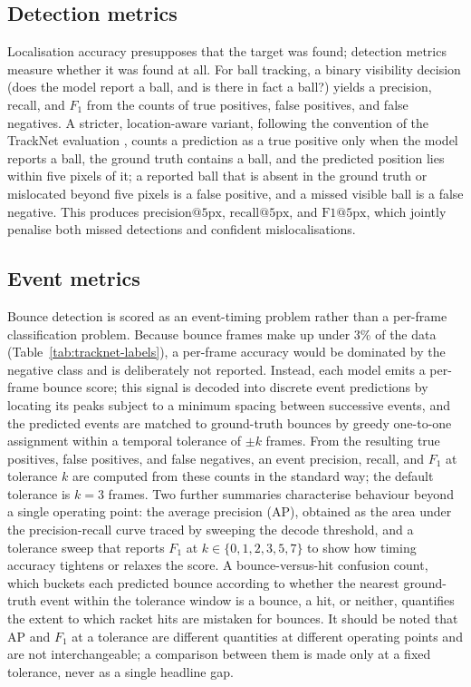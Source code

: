 \subsection{Detection metrics}
\label{sec:meth-metrics-det}

Localisation accuracy presupposes that the target was found; detection metrics
measure whether it was found at all. For ball tracking, a binary
visibility decision (does the model report a ball, and is there in fact a ball?)
yields a precision, recall, and $F_1$ from the counts of true positives,
false positives, and false negatives. A stricter, location-aware variant,
following the convention of the TrackNet evaluation \cite{huang2019tracknet},
counts a prediction as a true positive only when the model reports a ball, the
ground truth contains a ball, and the predicted position lies within five pixels
of it; a reported ball that is absent in the ground truth or mislocated beyond
five pixels is a false positive, and a missed visible ball is a false negative.
This produces $\mathrm{precision@5px}$, $\mathrm{recall@5px}$, and
$\mathrm{F1@5px}$, which jointly penalise both missed detections and confident
mislocalisations.
\subsection{Event metrics}
\label{sec:meth-metrics-event}

Bounce detection is scored as an event-timing problem rather than a per-frame
classification problem. Because bounce frames make up under 3\% of the data
(Table~\ref{tab:tracknet-labels}), a per-frame accuracy would be dominated by
the negative class and is deliberately not reported. Instead, each model emits a
per-frame bounce score; this signal is decoded into discrete event
predictions by locating its peaks subject to a minimum spacing between
successive events, and the predicted events are matched to ground-truth
bounces by greedy one-to-one assignment within a temporal tolerance of
$\pm k$ frames. From the resulting true positives, false positives, and false
negatives, an event precision, recall, and $F_1$ at tolerance $k$ are computed
from these counts in the standard way; the default tolerance is $k = 3$ frames. Two further
summaries characterise behaviour beyond a single operating point: the average
precision (AP), obtained as the area under the precision-recall curve traced by
sweeping the decode threshold, and a tolerance sweep that reports $F_1$ at
$k \in \{0, 1, 2, 3, 5, 7\}$ to show how timing accuracy tightens or relaxes the
score. A bounce-versus-hit confusion count, which buckets each predicted bounce
according to whether the nearest ground-truth event within the tolerance window
is a bounce, a hit, or neither, quantifies the extent to which racket hits are
mistaken for bounces. It should be noted that AP and $F_1$ at a tolerance are
different quantities at different operating points and are not interchangeable; a
comparison between them is made only at a fixed tolerance, never as a single
headline gap.

